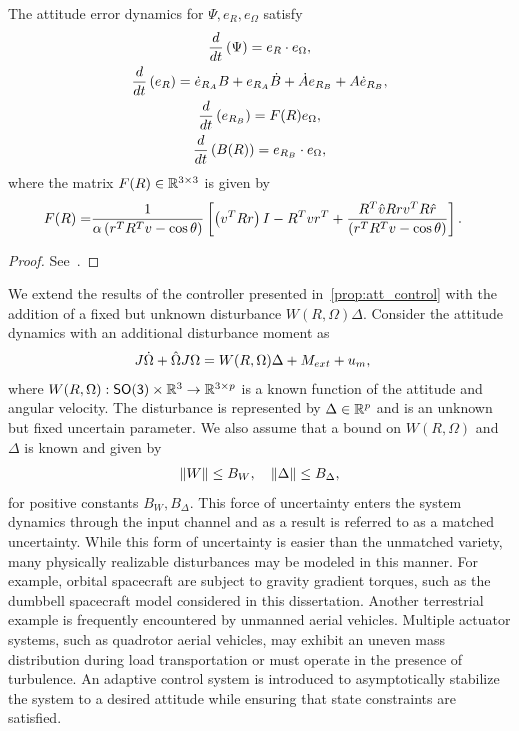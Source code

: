 \begin{prop}\label{prop:repulsive_error_dynamics}
	The attitude error dynamics for \( \Psi, e_R, e_\Omega \) satisfy 
	\begin{gather}
		\frac{d }{d t} \left( \Psi \right) = e_R \cdot e_\Omega , \label{eq:psi_dot}\\
		\frac{d }{d t} \left( e_R \right) = \dot{e}_{R_A} B + e_{R_A} \dot{B} + \dot{A}e_{R_B} + A \dot{e}_{R_B} , \label{eq:eR_dot} \\
		\frac{d }{d t} \left( e_{R_B} \right) = F(R) e_\Omega , \label{eq:eRB_dot} \\
		\frac{d }{d t} \left( B(R) \right) = e_{R_B} \cdot e_\Omega , \label{eq:B_dot}
	\end{gather}
	where the matrix \(F(R) \in \mathbb{R}^{3\times3} \) is given by
	\begin{align}
		F(R) = &\frac{1}{\alpha \left( r^T R^T v - \cos \theta \right)} \left[\left( v^T R r \right) I - R^T v r^T + \frac{R^T \hat{v} R r v^T R \hat{r}}{\left( r^T R^T v - \cos \theta \right)}\right]. \label{eq:F}
	\end{align}
\end{prop}
\begin{proof}
    See~.
\end{proof}

We extend the results of the controller presented in~\cref{prop:att_control} with the addition of a fixed but unknown disturbance \( W(R, \Omega) \Delta \).
Consider the attitude dynamics with an additional disturbance moment as
\begin{align*}
    J \dot{\Omega} + \hat{\Omega} J \Omega &= W(R, \Omega)\Delta  +  M_{ext} + u_m,
\end{align*}
where \( W(R, \Omega) : \mathsf{SO(3)} \times \mathbb{R}^3 \to \mathbb{R}^{3 \times p } \) is a known function of the attitude and angular velocity.
The disturbance is represented by \( \Delta \in \mathbb{R}^p \) and is an unknown but fixed uncertain parameter.
We also assume that a bound on \( W(R, \Omega) \) and \( \Delta \) is known and given by
\begin{align}\label{eq:disturbance_bounds}
    \left\| W \right\| \leq B_W, \quad \left\| \Delta \right\| \leq B_\Delta,
\end{align}
for positive constants \(B_W, B_\Delta\).
This force of uncertainty enters the system dynamics through the input channel and as a result is referred to as a matched uncertainty.
While this form of uncertainty is easier than the unmatched variety, many physically realizable disturbances may be modeled in this manner.
For example, orbital spacecraft are subject to gravity gradient torques, such as the dumbbell spacecraft model considered in this dissertation.
Another terrestrial example is frequently encountered by unmanned aerial vehicles.
Multiple actuator systems, such as quadrotor aerial vehicles, may exhibit an uneven mass distribution during load transportation or must operate in the presence of turbulence.
An adaptive control system is introduced to asymptotically stabilize the system to a desired attitude while ensuring that state constraints are satisfied. %

